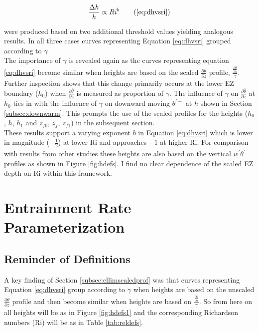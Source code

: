 \begin{equation}
\frac{\Delta h}{h} \propto Ri ^{b} \tag{\ref{eq:dhvsri}}
\end{equation}

were produced based on two additional threshold values yielding analogous results.  In all three cases curves representing Equation \ref{eq:dhvsri} grouped according to $\gamma$\\

The importance of $\gamma$ is revealed again as the curves representing equation \ref{eq:dhvsri} become similar when heights are based on the scaled $\frac{\partial \overline{\theta}}{\partial z}$ profile, $\frac{\frac{\partial \overline{\theta}}{\partial z}}{\gamma}$. Further inspection shows that this change primarily occurs at the lower \acs{EZ} boundary ($h_{0}$) when $\frac{\partial \overline{\theta}}{\partial z}$ is measured as proportion of $\gamma$. The influence of $\gamma$ on $\frac{\partial \overline{\theta}}{\partial z}$ at $h_{0}$ ties in with the influence of $\gamma$ on downward moving $\theta^{'+}$ at $h$ shown in Section \ref{subsec:downwarm}.  This prompts the use of the scaled profiles for the heights ($h_{0}$, $h$, $h_{1}$ and $z_{f0}$, $z_{f}$, $z_{f1}$) in the subsequent section.\\

These results support a varying exponent $b$ in Equation \ref{eq:dhvsri} which is lower in magnitude ($-\frac{1}{2}$) at lower \acs{Ri} and approaches $-1$ at higher \acs{Ri}.  For comparison with results from other studies these heights are also based on the vertical $\overline{w^{'}\theta^{'}}$ profiles as shown in Figure \ref{fig:hdefs}. I find no clear dependence of the scaled \acs{EZ} depth on \acs{Ri} within this framework. \\

\clearpage

\section{Entrainment Rate Parameterization}
\label{sec:weri}
\FloatBarrier


\subsection{Reminder of Definitions}

A key finding of Section \ref{subsec:ellimscaledprof} was that curves representing Equation \ref{eq:dhvsri} group according
to $\gamma$ when heights are based on the unscaled $\frac{\partial \overline{\theta}}{\partial z}$ profile and then become similar
when heights are based on $\frac{\frac{\partial \overline{\theta}}{\partial z}}{\gamma}$.  So from here on all heights will be as in
Figure \ref{fig:hdefs1} and the corresponding Richardson numbers (\acs{Ri}) will be as in Table \ref{tab:reldefs}.\\ 

